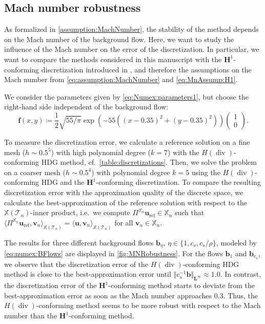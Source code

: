 \documentclass{m2an}
\newcommand{\bflow}{\mathbf{b}}
\renewcommand{\u}{\mathbf{u}}
\renewcommand{\v}{\mathbf{v}}
\renewcommand{\div}{\operatorname{div}}
\newcommand{\calT}{\mathcal{T}}
\newcommand{\X}{\mathbb{X}}
\newcommand{\Xn}{\mathbb{X}_n}
\newcommand{\bH}{{\mathbf H}}
\newcommand{\bL}{\mathbf{L}}
\newcommand{\bff}{\mathbf{f}}
\newcommand{\Tn}{\calT_n}
\newcommand{\spl}{\langle}
\newcommand{\spr}{\rangle}
\theoremstyle{plain}
\theoremstyle{definition}
\begin{document}
\subsection{Mach number robustness}\label{subsec:numex:mach}
As formalized in \cref{assumption:MachNumber}, the stability of the method depends on the Mach number of the background flow. Here, we want to study the influence of the Mach number on the error of the discretization. In particular, we want to compare the methods considered in this manuscript with the $\bH^1$-conforming discretization introduced in \cite{HLS22H1}, and therefore the assumptions on the Mach number from \eqref{eq:assumption:MachNumber} and \eqref{eq:MnAssump:H1}.

We consider the parameters given by \eqref{eq:Numex:parameters1}, but choose the right-hand side independent of the background flow: 
\begin{equation}
   \bff(x,y) \coloneqq \frac{1}{2} \sqrt{55/\pi} \exp(-55((x-0.35)^2 + (y-0.35)^2)) \begin{pmatrix}
      1 \\ 0
   \end{pmatrix}.
\end{equation}

To measure the discretization error, we calculate a reference solution on a fine mesh ($h \sim 0.5^5$) with high polynomial degree ($k = 7$) with the $H(\div)$-conforming HDG method, cf.~\cref{table:discretizations}. Then, we solve the problem on a coarser mesh ($h \sim 0.5^4$) with polynomial degree $k = 5$ using the $H(\div)$-conforming HDG and the $\bH^1$-conforming discretization. To compare the resulting discretization error with the approximation quality of the discrete space, we calculate the best-approximation of the reference solution with respect to the $\X(\Tn)$-inner product, i.e.~we compute $\Pi^{\X_n} \u_{\text{ref}} \in \Xn$ such that $\spl \Pi^{\X_n} \u_{\text{ref}}, \v_n \spr_{\X(\Tn)} = \spl \u, \v_n \spr_{\X(\Tn)}$ for all $\v_n \in \Xn$. 

The results for three different background flows $\bflow_{\eta}$, $\eta \in \{1,c_s,c_s/\rho\}$, modeled by \eqref{eq:numex:BFlows} are displayed in \cref{fig:MNRobustness}. For the flows $\bflow_1$ and $\bflow_{c_s}$, we observe that the discretization error of the $H(\div)$-conforming HDG method is close to the best-approximation error until $\Vert c_s^{-1} \bflow \Vert_{\bL^\infty} \approx 1.0$. In contrast, the discretization error of the $\bH^1$-conforming method starts to deviate from the best-approximation error as soon as the Mach number approaches $0.3$. Thus, the $H(\div)$-conforming method seems to be more robust with respect to the Mach number than the $\bH^1$-conforming method.
\end{document}
